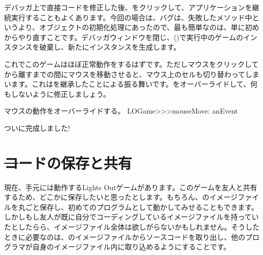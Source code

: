\documentclass[a4paper,10pt,twoside]{book}
\begin{document}
デバッガ上で直接コードを修正した後、をクリックして、アプリケーションを継続実行することもよくあります。今回の場合は、バグは、失敗したメソッド中というより、オブジェクトの初期化処理にあったので、最も簡単なのは、単に初めからやり直すことです。デバッガウィンドウを閉じ、()で実行中のゲームのインスタンスを破棄し、新たにインスタンスを生成します。



これでこのゲームはほぼ正常動作をするはずです。ただしマウスをクリックしてから離すまでの間にマウスを移動させると、マウス上のセルも切り替わってしまいます。これはを継承したことによる振る舞いです。をオーバーライドして、何もしないように修正しましょう。

\begin{method}[mouseMove:]{マウスの動作をオーバーライドする。}
LOGame>>>mouseMove: anEvent
\end{method}

ついに完成しました!


\section{\st コードの保存と共有}

現在、手元には動作するLights Outゲームがあります。このゲームを友人と共有するため、どこかに保存したいと思ったとします。もちろん、\pharo のイメージファイルを丸ごと保存し、初めてのプログラムとして動かしてみせることもできます。しかしもし友人が既に自分でコーディングしているイメージファイルを持っていたとしたらら、イメージファイル全体は欲しがらないかもしれません。そうしたときに必要なのは、\pharo のイメージファイルからソースコードを取り出し、他のプログラマが自身のイメージファイル内に取り込めるようにすることです。
\end{document}
